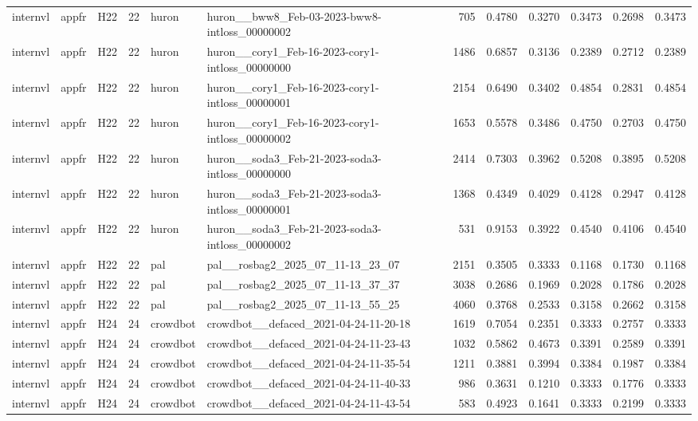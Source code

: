 \begin{table}[tbp]
\begin{tabular}{lllrllrrrrrr}
internvl & appfr & H22 & 22 & huron & huron\_\_bww8\_Feb-03-2023-bww8-intloss\_00000002 & 705 & 0.4780 & 0.3270 & 0.3473 & 0.2698 & 0.3473 \\
internvl & appfr & H22 & 22 & huron & huron\_\_cory1\_Feb-16-2023-cory1-intloss\_00000000 & 1486 & 0.6857 & 0.3136 & 0.2389 & 0.2712 & 0.2389 \\
internvl & appfr & H22 & 22 & huron & huron\_\_cory1\_Feb-16-2023-cory1-intloss\_00000001 & 2154 & 0.6490 & 0.3402 & 0.4854 & 0.2831 & 0.4854 \\
internvl & appfr & H22 & 22 & huron & huron\_\_cory1\_Feb-16-2023-cory1-intloss\_00000002 & 1653 & 0.5578 & 0.3486 & 0.4750 & 0.2703 & 0.4750 \\
internvl & appfr & H22 & 22 & huron & huron\_\_soda3\_Feb-21-2023-soda3-intloss\_00000000 & 2414 & 0.7303 & 0.3962 & 0.5208 & 0.3895 & 0.5208 \\
internvl & appfr & H22 & 22 & huron & huron\_\_soda3\_Feb-21-2023-soda3-intloss\_00000001 & 1368 & 0.4349 & 0.4029 & 0.4128 & 0.2947 & 0.4128 \\
internvl & appfr & H22 & 22 & huron & huron\_\_soda3\_Feb-21-2023-soda3-intloss\_00000002 & 531 & 0.9153 & 0.3922 & 0.4540 & 0.4106 & 0.4540 \\
internvl & appfr & H22 & 22 & pal & pal\_\_rosbag2\_2025\_07\_11-13\_23\_07 & 2151 & 0.3505 & 0.3333 & 0.1168 & 0.1730 & 0.1168 \\
internvl & appfr & H22 & 22 & pal & pal\_\_rosbag2\_2025\_07\_11-13\_37\_37 & 3038 & 0.2686 & 0.1969 & 0.2028 & 0.1786 & 0.2028 \\
internvl & appfr & H22 & 22 & pal & pal\_\_rosbag2\_2025\_07\_11-13\_55\_25 & 4060 & 0.3768 & 0.2533 & 0.3158 & 0.2662 & 0.3158 \\
internvl & appfr & H24 & 24 & crowdbot & crowdbot\_\_defaced\_2021-04-24-11-20-18 & 1619 & 0.7054 & 0.2351 & 0.3333 & 0.2757 & 0.3333 \\
internvl & appfr & H24 & 24 & crowdbot & crowdbot\_\_defaced\_2021-04-24-11-23-43 & 1032 & 0.5862 & 0.4673 & 0.3391 & 0.2589 & 0.3391 \\
internvl & appfr & H24 & 24 & crowdbot & crowdbot\_\_defaced\_2021-04-24-11-35-54 & 1211 & 0.3881 & 0.3994 & 0.3384 & 0.1987 & 0.3384 \\
internvl & appfr & H24 & 24 & crowdbot & crowdbot\_\_defaced\_2021-04-24-11-40-33 & 986 & 0.3631 & 0.1210 & 0.3333 & 0.1776 & 0.3333 \\
internvl & appfr & H24 & 24 & crowdbot & crowdbot\_\_defaced\_2021-04-24-11-43-54 & 583 & 0.4923 & 0.1641 & 0.3333 & 0.2199 & 0.3333 \\

\end{tabular}
\end{table}
